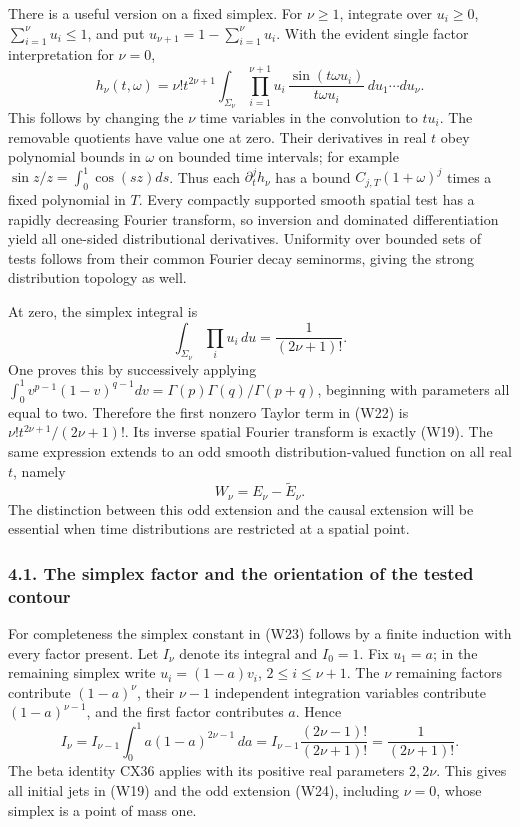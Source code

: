 \documentclass[
  11pt,
]{article}
\begin{document}
There is a useful version on a fixed simplex. For \(\nu\geq1\),
integrate over \(u_i\geq0\), \(\sum_{i=1}^{\nu}u_i\leq1\), and put
\(u_{\nu+1}=1-\sum_{i=1}^{\nu}u_i\). With the evident single factor
interpretation for \(\nu=0\), \[
 h_\nu(t,\omega)=\nu!t^{2\nu+1}
 \int_{\Sigma_\nu}\prod_{i=1}^{\nu+1}
       u_i\,\frac{\sin(t\omega u_i)}{t\omega u_i}\,du_1\cdots du_\nu.
 \tag{W22}
\] This follows by changing the \(\nu\) time variables in the
convolution to \(tu_i\). The removable quotients have value one at zero.
Their derivatives in real \(t\) obey polynomial bounds in \(\omega\) on
bounded time intervals; for example \(\sin z/z=\int_0^1\cos(sz)ds\).
Thus each \(\partial_t^jh_\nu\) has a bound \(C_{j,T}(1+\omega)^j\)
times a fixed polynomial in \(T\). Every compactly supported smooth
spatial test has a rapidly decreasing Fourier transform, so inversion
and dominated differentiation yield all one-sided distributional
derivatives. Uniformity over bounded sets of tests follows from their
common Fourier decay seminorms, giving the strong distribution topology
as well.

At zero, the simplex integral is \[
                       \int_{\Sigma_\nu}\prod_i u_i\,du
                                  =\frac1{(2\nu+1)!}.
 \tag{W23}
\] One proves this by successively applying
\(\int_0^1v^{p-1}(1-v)^{q-1}dv=\Gamma(p)\Gamma(q)/\Gamma(p+q)\),
beginning with parameters all equal to two. Therefore the first nonzero
Taylor term in (W22) is \(\nu!t^{2\nu+1}/(2\nu+1)!\). Its inverse
spatial Fourier transform is exactly (W19). The same expression extends
to an odd smooth distribution-valued function on all real \(t\), namely
\[
                              W_\nu=E_\nu-\widetilde E_\nu.
 \tag{W24}
\] The distinction between this odd extension and the causal extension
will be essential when time distributions are restricted at a spatial
point.

\subsubsection{4.1. The simplex factor and the orientation of the tested
contour}\label{the-simplex-factor-and-the-orientation-of-the-tested-contour}

For completeness the simplex constant in (W23) follows by a finite
induction with every factor present. Let \(I_\nu\) denote its integral
and \(I_0=1\). Fix \(u_1=a\); in the remaining simplex write
\(u_i=(1-a)v_i\), \(2\leq i\leq\nu+1\). The \(\nu\) remaining factors
contribute \((1-a)^\nu\), their \(\nu-1\) independent integration
variables contribute \((1-a)^{\nu-1}\), and the first factor contributes
\(a\). Hence \[
 I_\nu=I_{\nu-1}\int_0^1a(1-a)^{2\nu-1}\,da
       =I_{\nu-1}\frac{(2\nu-1)!}{(2\nu+1)!}
       =\frac1{(2\nu+1)!}.
 \tag{WA6}
\] The beta identity CX36 applies with its positive real parameters
\(2,2\nu\). This gives all initial jets in (W19) and the odd extension
(W24), including \(\nu=0\), whose simplex is a point of mass one.
\end{document}
